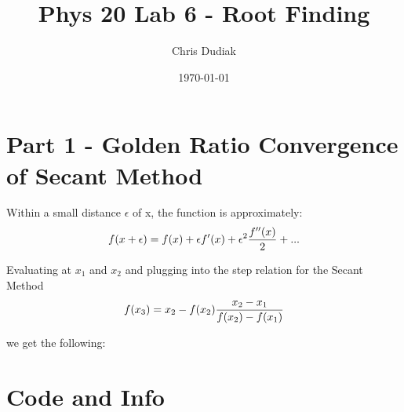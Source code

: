 \documentclass{article}
\begin{document}
\title{Phys 20 Lab 6 - Root Finding}
\author{Chris Dudiak}
\date{\today}
\maketitle

\section{Part 1 - Golden Ratio Convergence of Secant Method}

Within a small distance $\epsilon$ of x, the function is approximately:
\begin{align*}
	f(x + \epsilon) = f(x) + \epsilon f'(x) + \epsilon^2 {f''(x) \over 2} + ...
\end{align*}

Evaluating at $x_1$ and $x_2$ and plugging into the step relation for the Secant Method
\begin{align*}
	f(x_3) = x_2 - f(x_2) {x_2 - x_1 \over f(x_2) - f(x_1)}
\end{align*}

we get the following:


\section{Code and Info}
\end{document}
